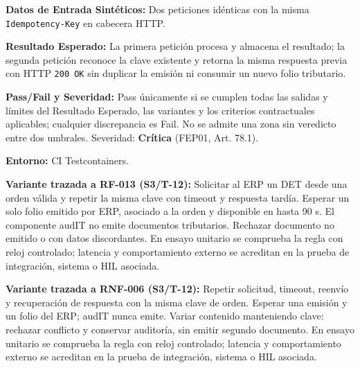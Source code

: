 \par\noindent\textbf{Datos de Entrada Sintéticos:} Dos peticiones idénticas con la misma \texttt{I\allowbreak{}d\allowbreak{}e\allowbreak{}m\allowbreak{}p\allowbreak{}o\allowbreak{}t\allowbreak{}e\allowbreak{}n\allowbreak{}c\allowbreak{}y\allowbreak{}-\allowbreak{}K\allowbreak{}e\allowbreak{}y\allowbreak{}} en cabecera HTTP.\par
\par\noindent\textbf{Resultado Esperado:} La primera petición procesa y almacena el resultado; la segunda petición reconoce la clave existente y retorna la misma respuesta previa con HTTP \texttt{2\allowbreak{}0\allowbreak{}0\allowbreak{} O\allowbreak{}K\allowbreak{}} sin duplicar la emisión ni consumir un nuevo folio tributario.\par
\par\noindent\textbf{Pass/Fail y Severidad:} Pass únicamente si se cumplen todas las salidas y límites del Resultado Esperado, las variantes y los criterios contractuales aplicables; cualquier discrepancia es Fail. No se admite una zona sin veredicto entre dos umbrales. Severidad: \textbf{Crítica} (FEP01, Art. 78.1).\par
\par\noindent\textbf{Entorno:} CI Testcontainers.\par







\par\noindent\textbf{Variante trazada a RF-013 (S3/T-12):} Solicitar al ERP un DET desde una orden válida y repetir la misma clave con timeout y respuesta tardía. Esperar un solo folio emitido por ERP, asociado a la orden y disponible en hasta 90 s. El componente audIT no emite documentos tributarios. Rechazar documento no emitido o con datos discordantes. En ensayo unitario se comprueba la regla con reloj controlado; latencia y comportamiento externo se acreditan en la prueba de integración, sistema o HIL asociada.\par

\par\noindent\textbf{Variante trazada a RNF-006 (S3/T-12):} Repetir solicitud, timeout, reenvío y recuperación de respuesta con la misma clave de orden. Esperar una emisión y un folio del ERP; audIT nunca emite. Variar contenido manteniendo clave: rechazar conflicto y conservar auditoría, sin emitir segundo documento. En ensayo unitario se comprueba la regla con reloj controlado; latencia y comportamiento externo se acreditan en la prueba de integración, sistema o HIL asociada.\par
